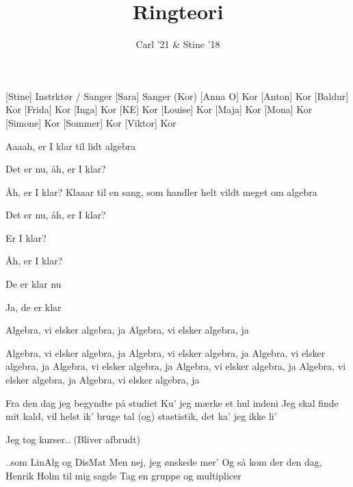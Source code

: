 \documentclass[a4paper,11pt]{article}
\title{Ringteori}
\author{Carl '21 \& Stine '18}
\begin{document}
\maketitle

\begin{roles}
[Stine] Instrktør / Sanger
[Sara] Sanger (Kor)
[Anna O] Kor
[Anton] Kor
[Baldur] Kor
[Frida] Kor
[Inga] Kor
[KE] Kor
[Louise] Kor
[Maja] Kor
[Mona] Kor
[Simone] Kor
[Sommer] Kor
[Viktor] Kor
\end{roles}

\begin{song}
%  
Aaaah, er I klar til lidt algebra 

% 
Det er nu, åh, er I klar?

%
Åh, er I klar?
Klaaar til en sang, som handler helt vildt meget om algebra

% 
Det er nu, åh, er I klar?

%
Er I klar?

% 
Åh, er I klar?


%
De er klar nu

% 
Ja, de er klar

% 
Algebra, vi elsker algebra, ja
Algebra, vi elsker algebra, ja


% 
Algebra, vi elsker algebra, ja
Algebra, vi elsker algebra, ja
Algebra, vi elsker algebra, ja
Algebra, vi elsker algebra, ja
Algebra, vi elsker algebra, ja
Algebra, vi elsker algebra, ja
Algebra, vi elsker algebra, ja

				
% 
Fra den dag jeg begyndte på studiet
Ku’ jeg mærke et hul indeni
Jeg skal finde mit kald, vil helst ik’ bruge tal
(og) stastistik, det ka' jeg ikke li'


%
Jeg tog kurser.. (Bliver afbrudt)

%
..som LinAlg og DisMat
Men nej, jeg ønskede mer'
Og så kom der den dag, Henrik Holm til mig sagde
Tag en gruppe og multiplicer
				

\end{song}
\end{document}
